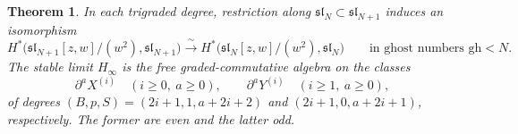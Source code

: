 \documentclass[11pt]{amsart}
\numberwithin{equation}{section}
\newtheorem{theorem}{Theorem}[section]
\theoremstyle{definition}
\theoremstyle{remark}
\newcommand{\dd}{\partial}
\newcommand{\gh}{\mathrm{gh}}
\begin{document}
\begin{theorem}\label{thm:stable}
In each trigraded degree, restriction along $\mathfrak{sl}_N\subset\mathfrak{sl}_{N+1}$ induces an isomorphism
\begin{equation}\label{eq:stability}
H^*\bigl(\mathfrak{sl}_{N+1}[z,w]/(w^2),\mathfrak{sl}_{N+1}\bigr)\xrightarrow{\ \sim\ }H^*\bigl(\mathfrak{sl}_N[z,w]/(w^2),\mathfrak{sl}_N\bigr)\qquad\text{in ghost numbers }\gh<N.
\end{equation}
The stable limit $H_\infty$ is the free graded-commutative algebra on the classes
\begin{equation}\label{eq:stable-generators}
\dd^aX^{(i)}\quad(i\ge0,\ a\ge0),\qquad \dd^aY^{(i)}\quad(i\ge1,\ a\ge0),
\end{equation}
of degrees $(B,p,S)=(2i+1,1,a+2i+2)$ and $(2i+1,0,a+2i+1)$, respectively. The former are even and the latter odd.
\end{theorem}
\end{document}
